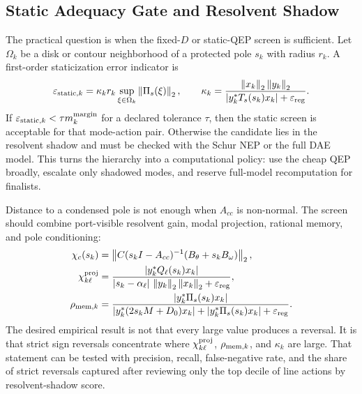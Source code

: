 \subsection{Static Adequacy Gate and Resolvent Shadow}

The practical question is when the fixed-\(D\) or static-QEP screen is
sufficient. Let \(\Omega_k\) be a disk or contour neighborhood of a protected
pole \(s_k\) with radius \(r_k\). A first-order staticization error indicator is
\begin{equation}
  \varepsilon_{{\rm static},k}
  =
  \kappa_k r_k
  \sup_{\xi\in\Omega_k}\left\lVert \Pi_s(\xi) \right\rVert_2,
  \qquad
  \kappa_k
  =
  \frac{\left\lVert x_k \right\rVert_2\left\lVert y_k \right\rVert_2}
       {|y_k^*T_s(s_k)x_k|+\varepsilon_{\rm reg}}.
  \label{eq:static_adequacy_gate}
\end{equation}
If \(\varepsilon_{{\rm static},k}<\tau m_k^{\rm margin}\) for a declared
tolerance \(\tau\), then the static screen is acceptable for that mode-action
pair. Otherwise the candidate lies in the resolvent shadow and must be checked
with the Schur NEP or the full DAE model. This turns the hierarchy into a
computational policy: use the cheap QEP broadly, escalate only shadowed modes,
and reserve full-model recomputation for finalists.

Distance to a condensed pole is not enough when \(A_{cc}\) is non-normal. The
screen should combine port-visible resolvent gain, modal projection, rational
memory, and pole conditioning:
\begin{align}
  \chi_c(s_k)
  &=
  \left\lVert C(s_kI-A_{cc})^{-1}(B_\theta+s_kB_\omega) \right\rVert_2,
  \label{eq:port_visible_resolvent_gain}\\
  \chi_{k\ell}^{\rm proj}
  &=
  \frac{|y_k^*Q_\ell(s_k)x_k|}
       {|s_k-\alpha_\ell|\,\left\lVert y_k \right\rVert_2\left\lVert x_k \right\rVert_2+\varepsilon_{\rm reg}},
  \label{eq:projected_resolvent_shadow}\\
  \rho_{{\rm mem},k}
  &=
  \frac{|y_k^*\Pi_s(s_k)x_k|}
       {|y_k^*(2s_kM+D_0)x_k|+|y_k^*\Pi_s(s_k)x_k|
        +\varepsilon_{\rm reg}}.
  \label{eq:memory_dominance_index}
\end{align}
The desired empirical result is not that every large value produces a
reversal. It is that strict sign reversals concentrate where
\(\chi_{k\ell}^{\rm proj}\), \(\rho_{{\rm mem},k}\), and \(\kappa_k\) are large.
That statement can be tested with precision, recall, false-negative rate, and
the share of strict reversals captured after reviewing only the top decile of
line actions by resolvent-shadow score.

